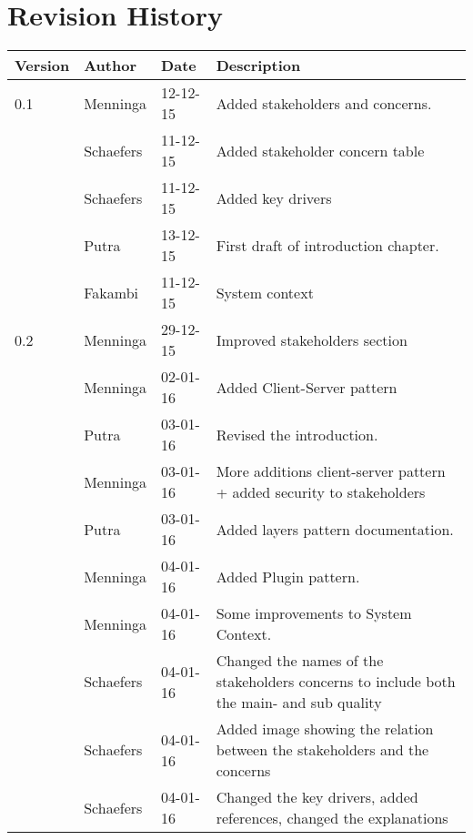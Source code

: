 \section*{Revision History}
\begin{longtable}{L{} L{} L{} L{}}
	\textbf{Version} & \textbf{Author}       & \textbf{Date} & \textbf{Description}                                                                                                                                                                                                       \\ \endhead	\toprule
				0.1 & Menninga  & 12-12-15 & Added stakeholders and concerns. \\
					& Schaefers & 11-12-15 & Added stakeholder concern table\\
					& Schaefers & 11-12-15 & Added key drivers\\
					& Putra		& 13-12-15 & First draft of introduction chapter. \\
					& Fakambi   & 11-12-15 & System context\\
				\midrule
			
				0.2 & Menninga  & 29-12-15 & Improved stakeholders section \\
					& Menninga  & 02-01-16 & Added Client-Server pattern \\
					& Putra		& 03-01-16 & Revised the introduction. \\
					& Menninga  & 03-01-16 & More additions client-server pattern + added security to stakeholders \\
					& Putra		& 03-01-16 & Added layers pattern documentation. \\
					& Menninga	& 04-01-16 & Added Plugin pattern. \\
					& Menninga  & 04-01-16 & Some improvements to System Context. \\
					& Schaefers & 04-01-16 & Changed the names of the stakeholders concerns to include both the main- and sub quality \\
					& Schaefers & 04-01-16 & Added image showing the relation between the stakeholders and the concerns \\
					& Schaefers & 04-01-16 & Changed the key drivers, added references, changed the explanations \\
				\midrule


\end{longtable}
